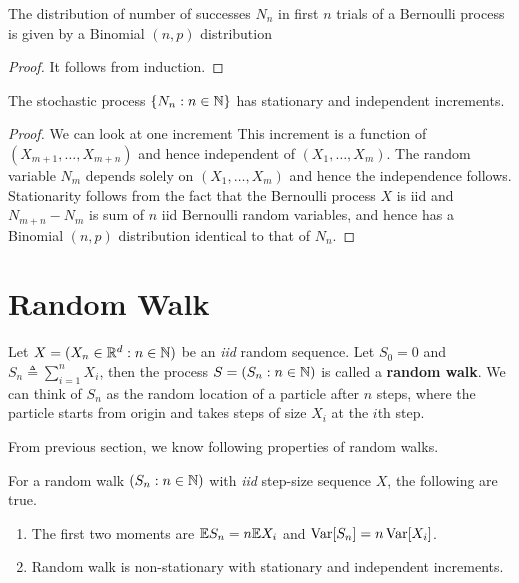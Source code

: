 \documentclass[a4paper,10pt,english]{article}
\begin{document}
\begin{thm} The distribution of number of successes $N_n$ in first $n$ trials of a Bernoulli process is given by a Binomial $(n,p)$ distribution 
\end{thm}
\begin{proof} 
It follows from induction. 
\end{proof}
\begin{cor} 
The stochastic process $\{N_n: n \in \mathbb{N}\}$ has stationary and independent increments.
\end{cor}
\begin{proof}
We can look at one increment 
This increment is a function of $(X_{m+1}, \dots, X_{m+n})$ and hence independent of $(X_1, \dots, X_m)$. 
The random variable $N_m$ depends solely on $(X_1, \dots, X_m)$ and hence the independence follows. 
Stationarity follows from the fact that the Bernoulli process $X$ is iid and $N_{m+n}-N_m$ is sum of $n$ iid Bernoulli random variables, 
and hence has a Binomial $(n,p)$ distribution identical to that of $N_n$. 
\end{proof}

\section{Random Walk}
Let $X = (X_n \in \mathbb{R}^d: n \in \mathbb{N})$ be an \emph{iid} random sequence. 
Let $S_0 = 0$ and $S_n \triangleq \sum_{i=1}^nX_i$, then the process $S = (S_n: n \in \mathbb{N})$ is called a \textbf{random walk}. 
We can think of $S_n$ as the random location of a particle after $n$ steps, 
where the particle starts from origin and takes steps of size $X_i$ at the $i$th step. 

From previous section, we know following properties of random walks. 
\begin{thm} 
For a random walk $(S_n: n \in \mathbb{N})$ with \emph{iid} step-size sequence $X$, the following are true. 
\begin{enumerate}[i\_]
\item The first two moments are $\mathbb{E} S_n = n\mathbb{E} X_i$ and $\operatorname{Var}[S_n] = n\operatorname{Var}[X_i]$. 
\item Random walk is non-stationary with stationary and independent increments. 
\end{enumerate}
\end{thm}
\end{document}

